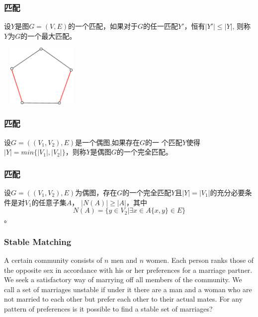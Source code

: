 \documentclass{beamer}
\begin{document}
\begin{CJK}{UTF8}{gbsn}
\begin{frame}
  \frametitle{匹配}
    \begin{definition6.4.6}
   设$Y$是图$G=(V,E)$的一个匹配，如果对于$G$的任一匹配$Y'$，恒有$|Y'|\leq |Y|$, 则称$Y$为$G$的一个\alert{最大匹配}。
  \end{definition6.4.6}
\pause
\centering
\includegraphics[width=4cm,height=3cm]{maximum}
\end{frame}
\begin{frame}
  \frametitle{匹配}
  \begin{definition6.4.7}
    设$G=((V_1,V_2),E)$是一个偶图,如果存在$G$的一
    个匹配$Y$使得$|Y|=min\{|V_1|,|V_2|\}$，则称$Y$是偶图$G$的一个\alert{完全匹配}。
  \end{definition6.4.7}
\end{frame}

\begin{frame}
  \frametitle{匹配}
  \begin{theorem6.4.3}
    设$G=((V_1,V_2),E)$为偶图，存在$G$的一个完全匹配$Y$且$|Y| = |V_1|$的充分必要条件是对$V_1$的任意子集$A$， $|N(A)| \geq |A|$，其中\[N(A) = \{y\in V_2|\exists x \in A \{x,y\} \in E\}\]。
  \end{theorem6.4.3}
\end{frame}
  \begin{frame}
    \frametitle{Stable Matching}
    \begin{definition1}
      A certain community consists of $n$ men and $n$ women. Each person ranks those of the opposite sex in accordance with his or her preferences for a marriage partner. We seek a satisfactory way of marrying off all members of the community. We call a set of marriages unstable if under it there are a man and a woman who are not married to each other but prefer each other to their actual mates. For any pattern of preferences is it possible to find a stable set of marriages?
    \end{definition1}
  \end{frame}
  

\end{CJK}
\end{document}
